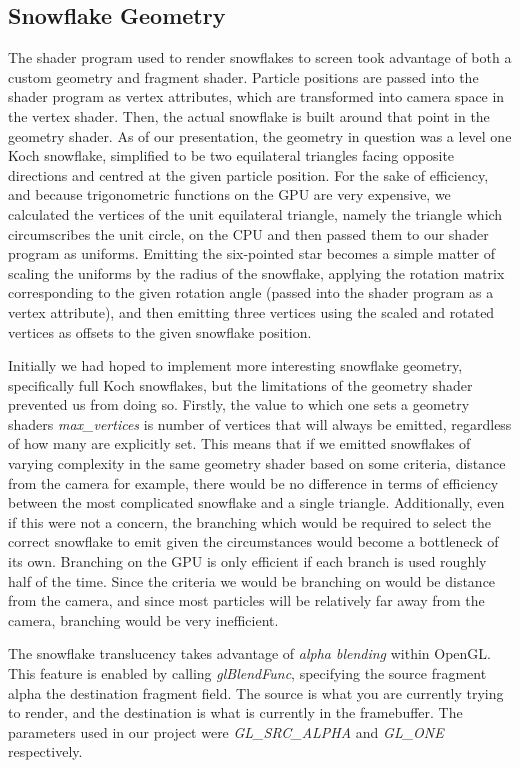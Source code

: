 \documentclass[conference]{acmsiggraph}
\begin{document}
\subsection{Snowflake Geometry}
The shader program used to render snowflakes to screen took advantage of both a custom geometry and fragment shader. Particle positions are passed into the shader program as vertex attributes, which are transformed into camera space in the vertex shader. Then, the actual snowflake is built around that point in the geometry shader. As of our presentation, the geometry in question was a level one Koch snowflake, simplified to be two equilateral triangles facing opposite directions and centred at the given particle position. For the sake of efficiency, and because trigonometric functions on the GPU are very expensive, we calculated the vertices of the unit equilateral triangle, namely the triangle which circumscribes the unit circle, on the CPU and then passed them to our shader program as uniforms. Emitting the six-pointed star becomes a simple matter of scaling the uniforms by the radius of the snowflake, applying the rotation matrix corresponding to the given rotation angle (passed into the shader program as a vertex attribute), and then emitting three vertices using the scaled and rotated vertices as offsets to the given snowflake position.

Initially we had hoped to implement more interesting snowflake geometry, specifically full Koch snowflakes, but the limitations of the geometry shader prevented us from doing so. Firstly, the value to which one sets a geometry shaders \textit{max\_vertices} is number of vertices that will always be emitted, regardless of how many are explicitly set. This means that if we emitted snowflakes of varying complexity in the same geometry shader based on some criteria, distance from the camera for example, there would be no difference in terms of efficiency between the most complicated snowflake and a single triangle. Additionally, even if this were not a concern, the branching which would be required to select the correct snowflake to emit given the circumstances would become a bottleneck of its own. Branching on the GPU is only efficient if each branch is used roughly half of the time. Since the criteria we would be branching on would be distance from the camera, and since most particles will be relatively far away from the camera, branching would be very inefficient.

The snowflake translucency takes advantage of \textit{alpha blending} within OpenGL. This feature is enabled by calling \textit{glBlendFunc}, specifying the source fragment alpha the destination fragment field. The source is what you are currently trying to render, and the destination is what is currently in the framebuffer. The parameters used in our project were \textit{GL\_SRC\_ALPHA}  and \textit{GL\_ONE} respectively.
\end{document}
